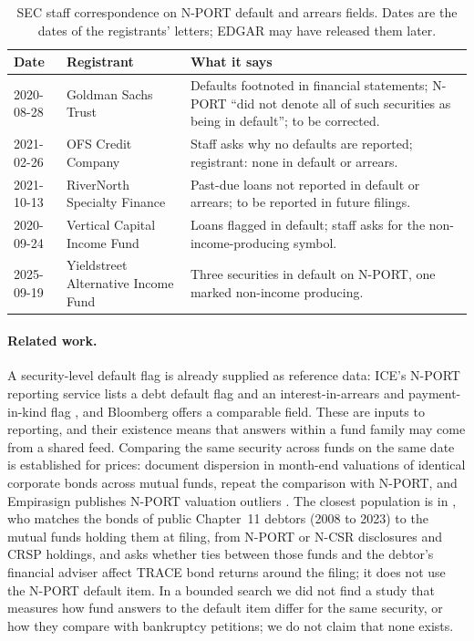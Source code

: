 \documentclass[11pt]{article}
\begin{document}
\begin{table}[!htb]
\centering\small
\caption{SEC staff correspondence on N-PORT default and arrears fields. Dates are the dates of the
registrants' letters; EDGAR may have released them later.}\label{tab:corr}
\begin{tabularx}{\textwidth}{@{}l l X@{}}
\toprule
Date & Registrant & What it says \\
\midrule
2020-08-28 & Goldman Sachs Trust & Defaults footnoted in financial statements; N-PORT ``did not denote all of such securities as being in default''; to be corrected. \\
2021-02-26 & OFS Credit Company & Staff asks why no defaults are reported; registrant: none in default or arrears. \\
2021-10-13 & RiverNorth Specialty Finance & Past-due loans not reported in default or arrears; to be reported in future filings. \\
2020-09-24 & Vertical Capital Income Fund & Loans flagged in default; staff asks for the non-income-producing symbol. \\
2025-09-19 & Yieldstreet Alternative Income Fund & Three securities in default on N-PORT, one marked non-income producing. \\
\bottomrule
\end{tabularx}
\end{table}

\paragraph{Related work.} A security-level default flag is already supplied as reference data: ICE's
N-PORT reporting service lists a debt default flag and an interest-in-arrears and payment-in-kind flag
\citep{ice_nport}, and Bloomberg offers a comparable field. These are inputs to reporting, and their
existence means that answers within a fund family may come from a shared feed. Comparing the same
security across funds on the same date is established for prices: \citet{cici2011} document dispersion
in month-end valuations of identical corporate bonds across mutual funds, \citet{morningstar2021}
repeat the comparison with N-PORT, and Empirasign publishes N-PORT valuation outliers
\citep{empirasign}. The closest population is in \citet{manoel2026}, who matches the bonds of public
Chapter~11 debtors (2008 to 2023) to the mutual funds holding them at filing, from N-PORT or N-CSR
disclosures and CRSP holdings, and asks whether ties between those funds and the debtor's financial
adviser affect TRACE bond returns around the filing; it does not use the N-PORT default item. In a bounded search we did not find a study that measures how fund
answers to the default item differ for the same security, or how they compare with bankruptcy
petitions; we do not claim that none exists.
\end{document}
